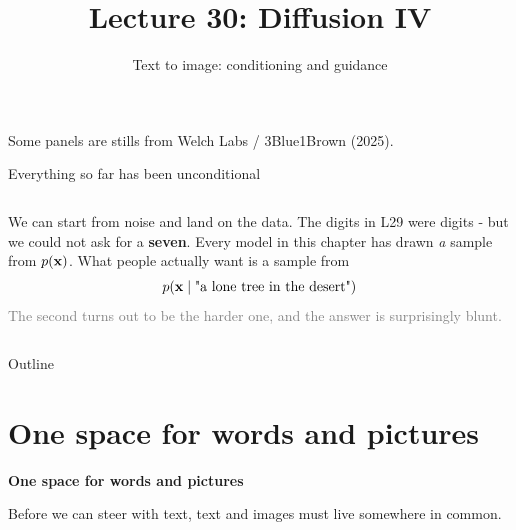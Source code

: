 \documentclass[aspectratio=169]{beamer}
\title{Lecture 30: Diffusion IV}
\subtitle{Text to image: conditioning and guidance}
\date{}
\begin{document}
\begin{frame}
  \titlepage
  \begin{center}\scriptsize\color{gray}
    Some panels are stills from Welch Labs / 3Blue1Brown (2025).
  \end{center}
\end{frame}

\begin{frame}{Everything so far has been unconditional}
  \small
  \begin{columns}[T]
    We can start from noise and land on the data. The digits in L29 were digits - but we
    could not ask for a \textbf{seven}.
    \vskip 6pt
    Every model in this chapter has drawn \emph{a} sample from $p(\mathbf{x})$. What people
    actually want is a sample from
    \[ p(\mathbf{x} \mid \text{"a lone tree in the desert"}) \]
    \vskip 4pt
    \footnotesize
    \textcolor{gray}{The second turns out to be the harder one, and the answer is
    surprisingly blunt.}
  \end{columns}
\end{frame}

\begin{frame}{Outline}
  \tableofcontents
\end{frame}

\section{One space for words and pictures}

\begin{frame}[plain]
  \vfill
  \begin{center}
    {\Large\color{popblue}\textbf{One space for words and pictures}}\\[0.9em]
    \begin{minipage}{0.82\textwidth}\centering\small
      Before we can steer with text, text and images must live somewhere in common.
    \end{minipage}
  \end{center}
  \vfill
\end{frame}
\end{document}
